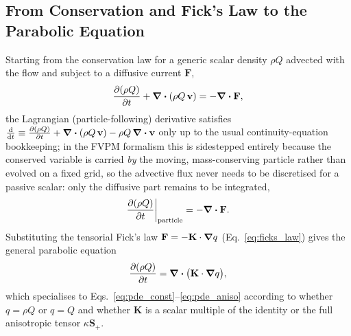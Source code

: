 \documentclass[11pt, a4paper, parskip]{scrartcl}
\theoremstyle{plain}
\theoremstyle{definition}
\newcommand{\Kmat}{\mathbf{K}}                            %
\newcommand{\Splus}{\mathbf{S}_{+}}                       %
\newcommand{\Fdiff}{\mathbf{F}}                           %
\newcommand{\kappaP}{\kappa}                              %
\begin{document}
\subsection{From Conservation and Fick's Law to the Parabolic Equation}
\label{app:derivation-pde}
Starting from the conservation law for a generic scalar density
$\rho Q$ advected with the flow and subject to a diffusive current
$\Fdiff$,
\begin{equation}
  \pdv{(\rho Q)}{t} + \div(\rho Q\,\mathbf v) = -\div\Fdiff ,
\end{equation}
the Lagrangian (particle-following) derivative satisfies
$\dv{}{t}(\rho Q) \equiv \pdv{(\rho Q)}{t} + \div(\rho Q\,\mathbf v) - \rho Q\,\div\mathbf v$
only up to the usual continuity-equation bookkeeping; in the FVPM
formalism this is sidestepped entirely because the conserved variable is
carried \emph{by} the moving, mass-conserving particle rather than
evolved on a fixed grid, so the advective flux never needs to be
discretised for a passive scalar: only the diffusive part remains to be
integrated,
\begin{equation}
  \pdv{(\rho Q)}{t}\bigg|_{\rm particle} = -\div\Fdiff .
\end{equation}
Substituting the tensorial Fick's law $\Fdiff = -\Kmat\cdot\grad q$
(Eq.~\eqref{eq:ficks_law}) gives the general parabolic equation
\begin{equation}
  \pdv{(\rho Q)}{t} = \div\big(\Kmat\cdot\grad q\big) ,
\end{equation}
which specialises to Eqs.~\eqref{eq:pde_const}--\eqref{eq:pde_aniso}
according to whether $q=\rho Q$ or $q=Q$ and whether $\Kmat$ is a scalar
multiple of the identity or the full anisotropic tensor $\kappaP\Splus$.
\end{document}
